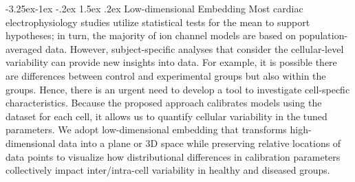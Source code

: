 \documentclass[11pt]{article}
\makeatletter
\renewcommand\subsection{\@startsection{subsection}{2}{\z@}%
                                     {-3.25ex\@plus -1ex \@minus -.2ex}%
                                     {1.5ex \@plus .2ex}%
                                     {\normalfont\fontfamily{phv}\fontsize{14}{17}\bfseries}}
\makeatother
\begin{document}
\subsection{Low-dimensional Embedding}
Most cardiac electrophysiology studies utilize statistical tests for the mean to support hypotheses; in turn, the majority of ion channel models are based on population-averaged data. However, subject-specific analyses that consider the cellular-level variability can provide new insights into data. For example, it is possible there are differences between control and experimental groups but also within the groups. Hence, there is an urgent need to develop a tool to investigate cell-specfic characteristics. Because the proposed approach calibrates models using the dataset for each cell, it allows us to quantify cellular variability in the tuned parameters. We adopt low-dimensional embedding that transforms high-dimensional data into a plane or 3D space while preserving relative locations of data points to visualize how distributional differences in calibration parameters collectively impact inter/intra-cell variability in healthy and diseased groups.
\end{document}
